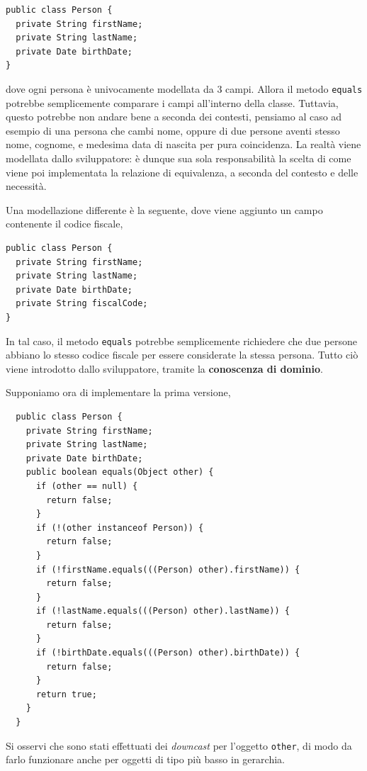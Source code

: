 \documentclass[\fontsizeclass,twocolumn]{\classname}
\theoremstyle{definition}
\theoremstyle{definition}
\begin{document}
\begin{lstlisting}
public class Person {
  private String firstName;
  private String lastName;
  private Date birthDate;
}
\end{lstlisting}

dove ogni persona è univocamente modellata da $3$ campi. Allora il metodo
\texttt{equals} potrebbe semplicemente comparare i campi all'interno della
classe. Tuttavia, questo potrebbe non andare bene a seconda dei contesti,
pensiamo al caso ad esempio di una persona che cambi nome, oppure di due persone
aventi stesso nome, cognome, e medesima data di nascita per pura coincidenza.
La realtà viene modellata dallo sviluppatore: è dunque sua sola responsabilità
la scelta di come viene poi implementata la relazione di equivalenza, a seconda
del contesto e delle necessità.

Una modellazione differente è la seguente, dove viene aggiunto un campo
contenente il codice fiscale,

\begin{lstlisting}
public class Person {
  private String firstName;
  private String lastName;
  private Date birthDate;
  private String fiscalCode;
}
\end{lstlisting}

In tal caso, il metodo \texttt{equals} potrebbe semplicemente richiedere che due
persone abbiano lo stesso codice fiscale per essere considerate la stessa
persona. Tutto ciò viene introdotto dallo sviluppatore, tramite la
\textbf{conoscenza di dominio}.

Supponiamo ora di implementare la prima versione,

\begin{lstlisting}
  public class Person {
    private String firstName;
    private String lastName;
    private Date birthDate;
    public boolean equals(Object other) {
      if (other == null) {
        return false;
      }
      if (!(other instanceof Person)) {
        return false;
      }
      if (!firstName.equals(((Person) other).firstName)) {
        return false;
      }
      if (!lastName.equals(((Person) other).lastName)) {
        return false;
      }
      if (!birthDate.equals(((Person) other).birthDate)) {
        return false;
      }
      return true;
    }
  }
\end{lstlisting}

Si osservi che sono stati effettuati dei \emph{downcast} per l'oggetto
\texttt{other}, di modo da farlo funzionare anche per oggetti di tipo più basso
in gerarchia.
\end{document}

